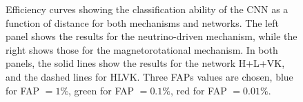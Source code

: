 \documentclass[aps,twocolumn,showpacs,groupedaddress, nofootinbib]{revtex4}  %
\begin{document}
%
%
\begin{figure}
     \begin{center}
        \quad
    \end{center}
    \caption{Efficiency curves showing the classification ability of the
\ac{CNN} as a function of distance for both mechanisms and networks.  The left
panel shows the results for the neutrino-driven mechanism, while the right
shows those for the magnetorotational mechanism. In both panels, the solid
lines show the results for the network H+L+VK, and the dashed lines for HLVK.
Three \acp{FAP} values are chosen, blue for \ac{FAP} $=1\%$, green for \ac{FAP}
$=0.1\%$, red for \ac{FAP} $=0.01\%$.\label{fig:eff}}
\end{figure}
\end{document}
